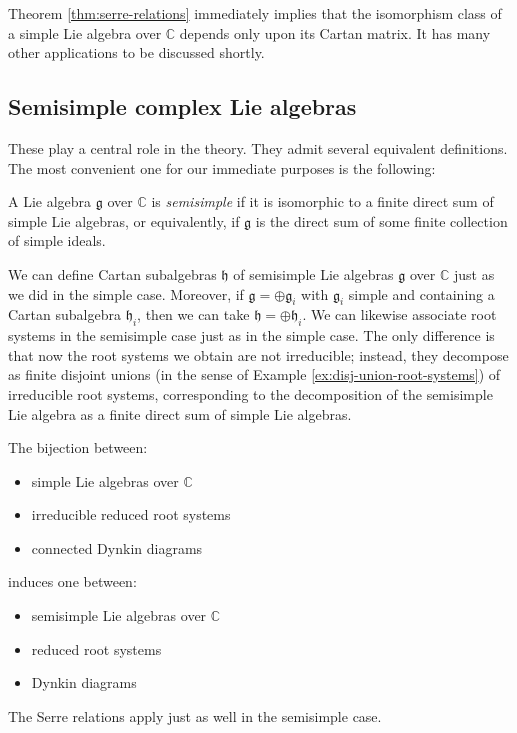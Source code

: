 \documentclass[reqno]{amsart} 
\begin{document}
Theorem \ref{thm:serre-relations} immediately implies that the isomorphism class of a simple Lie algebra over $\mathbb{C}$ depends only upon its Cartan matrix.  It has many other applications to be discussed shortly.

\subsection{Semisimple complex Lie algebras}
\label{sec:org051a3bb}
These play a central role in the theory.  They admit several equivalent definitions.  The most convenient one for our immediate purposes is the following:
\begin{definition}
  A Lie algebra $\mathfrak{g}$ over $\mathbb{C}$ is \emph{semisimple} if it is isomorphic to a finite direct sum of simple Lie algebras, or equivalently, if $\mathfrak{g}$ is the direct sum of some finite collection of simple ideals.
\end{definition}

We can define Cartan subalgebras $\mathfrak{h}$ of semisimple Lie algebras $\mathfrak{g}$ over $\mathbb{C}$ just as we did in the simple case.  Moreover, if $\mathfrak{g} = \oplus \mathfrak{g}_i$ with $\mathfrak{g}_i$ simple and containing a Cartan subalgebra $\mathfrak{h}_i$, then we can take $\mathfrak{h} = \oplus \mathfrak{h}_i$.  We can likewise associate root systems in the semisimple case just as in the simple case.  The only difference is that now the root systems we obtain are not irreducible; instead, they decompose as finite disjoint unions (in the sense of Example \ref{ex:disj-union-root-systems}) of irreducible root systems, corresponding to the decomposition of the semisimple Lie algebra as a finite direct sum of simple Lie algebras.

The bijection between:
\begin{itemize}
\item simple Lie algebras over $\mathbb{C}$
\item irreducible reduced root systems
\item connected Dynkin diagrams
\end{itemize}
induces one between:
\begin{itemize}
\item semisimple Lie algebras over $\mathbb{C}$
\item reduced root systems
\item Dynkin diagrams
\end{itemize}

The Serre relations apply just as well in the semisimple case.
\end{document}

